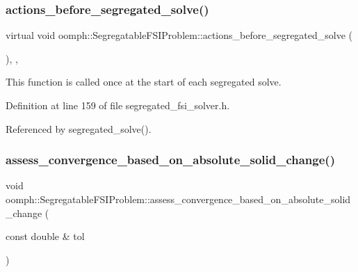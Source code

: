 \subsubsection{\texorpdfstring{actions\+\_\+before\+\_\+segregated\+\_\+solve()}{actions\_before\_segregated\_solve()}}
{\footnotesize\ttfamily virtual void oomph\+::\+Segregatable\+F\+S\+I\+Problem\+::actions\+\_\+before\+\_\+segregated\+\_\+solve (\begin{DoxyParamCaption}{ }\end{DoxyParamCaption})\hspace{0.3cm}{\ttfamily [inline]}, {\ttfamily [protected]}, {\ttfamily [virtual]}}



This function is called once at the start of each segregated solve. 



Definition at line 159 of file segregated\+\_\+fsi\+\_\+solver.\+h.



Referenced by segregated\+\_\+solve().

\mbox{\label{classoomph_1_1SegregatableFSIProblem_aa0b531963389cf3b2ad253891931def9}} 
\subsubsection{\texorpdfstring{assess\+\_\+convergence\+\_\+based\+\_\+on\+\_\+absolute\+\_\+solid\+\_\+change()}{assess\_convergence\_based\_on\_absolute\_solid\_change()}\hspace{0.1cm}{\footnotesize\ttfamily [1/2]}}
{\footnotesize\ttfamily void oomph\+::\+Segregatable\+F\+S\+I\+Problem\+::assess\+\_\+convergence\+\_\+based\+\_\+on\+\_\+absolute\+\_\+solid\+\_\+change (\begin{DoxyParamCaption}\item[{const double \&}]{tol }\end{DoxyParamCaption})\hspace{0.3cm}{\ttfamily [inline]}}



